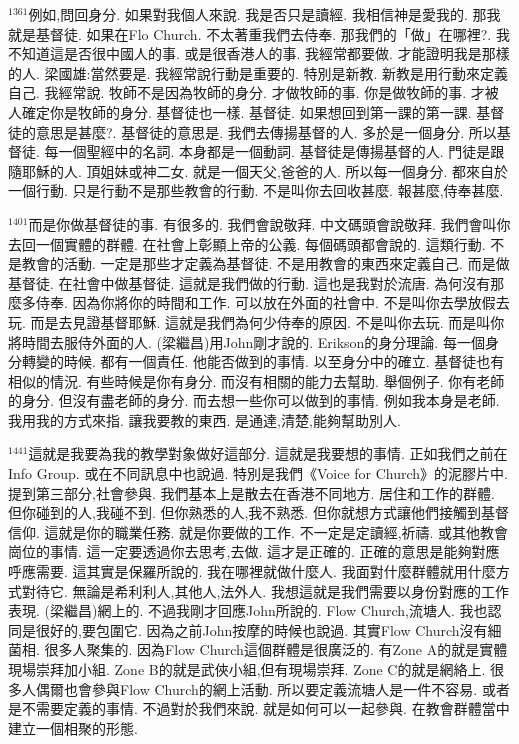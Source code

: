 \documentclass{book}
\begin{document}
$^{1361}$例如,問回身分.
如果對我個人來說.
我是否只是讀經.
我相信神是愛我的.
那我就是基督徒.
如果在Flo Church.
不太著重我們去侍奉.
那我們的「做」在哪裡?.
我不知道這是否很中國人的事.
或是很香港人的事.
我經常都要做.
才能證明我是那樣的人.
梁國雄:當然要是.
我經常說行動是重要的.
特別是新教.
新教是用行動來定義自己.
我經常說.
牧師不是因為牧師的身分.
才做牧師的事.
你是做牧師的事.
才被人確定你是牧師的身分.
基督徒也一樣.
基督徒.
如果想回到第一課的第一課.
基督徒的意思是甚麼?.
基督徒的意思是.
我們去傳揚基督的人.
多於是一個身分.
所以基督徒.
每一個聖經中的名詞.
本身都是一個動詞.
基督徒是傳揚基督的人.
門徒是跟隨耶穌的人.
頂姐妹或神二女.
就是一個天父,爸爸的人.
所以每一個身分.
都來自於一個行動.
只是行動不是那些教會的行動.
不是叫你去回收甚麼.
報甚麼,侍奉甚麼.

$^{1401}$而是你做基督徒的事.
有很多的.
我們會說敬拜.
中文碼頭會說敬拜.
我們會叫你去回一個實體的群體.
在社會上彰顯上帝的公義.
每個碼頭都會說的.
這類行動.
不是教會的活動.
一定是那些才定義為基督徒.
不是用教會的東西來定義自己.
而是做基督徒.
在社會中做基督徒.
這就是我們做的行動.
這也是我對於流唐.
為何沒有那麼多侍奉.
因為你將你的時間和工作.
可以放在外面的社會中.
不是叫你去學放假去玩.
而是去見證基督耶穌.
這就是我們為何少侍奉的原因.
不是叫你去玩.
而是叫你將時間去服侍外面的人.
(梁繼昌)用John剛才說的.
Erikson的身分理論.
每一個身分轉變的時候.
都有一個責任.
他能否做到的事情.
以至身分中的確立.
基督徒也有相似的情況.
有些時候是你有身分.
而沒有相關的能力去幫助.
舉個例子.
你有老師的身分.
但沒有盡老師的身分.
而去想一些你可以做到的事情.
例如我本身是老師.
我用我的方式來指.
讓我要教的東西.
是通達,清楚,能夠幫助別人.

$^{1441}$這就是我要為我的教學對象做好這部分.
這就是我要想的事情.
正如我們之前在Info Group.
或在不同訊息中也說過.
特別是我們《Voice for Church》的泥膠片中.
提到第三部分,社會參與.
我們基本上是散去在香港不同地方.
居住和工作的群體.
但你碰到的人,我碰不到.
但你熟悉的人,我不熟悉.
但你就想方式讓他們接觸到基督信仰.
這就是你的職業任務.
就是你要做的工作.
不一定是定讀經,祈禱.
或其他教會崗位的事情.
這一定要透過你去思考,去做.
這才是正確的.
正確的意思是能夠對應呼應需要.
這其實是保羅所說的.
我在哪裡就做什麼人.
我面對什麼群體就用什麼方式對待它.
無論是希利利人,其他人,法外人.
我想這就是我們需要以身份對應的工作表現.
(梁繼昌)網上的.
不過我剛才回應John所說的.
Flow Church,流塘人.
我也認同是很好的,要包圍它.
因為之前John按摩的時候也說過.
其實Flow Church沒有細菌相.
很多人聚集的.
因為Flow Church這個群體是很廣泛的.
有Zone A的就是實體現場崇拜加小組.
Zone B的就是武俠小組,但有現場崇拜.
Zone C的就是網絡上.
很多人偶爾也會參與Flow Church的網上活動.
所以要定義流塘人是一件不容易.
或者是不需要定義的事情.
不過對於我們來說.
就是如何可以一起參與.
在教會群體當中建立一個相聚的形態.
\end{document}
